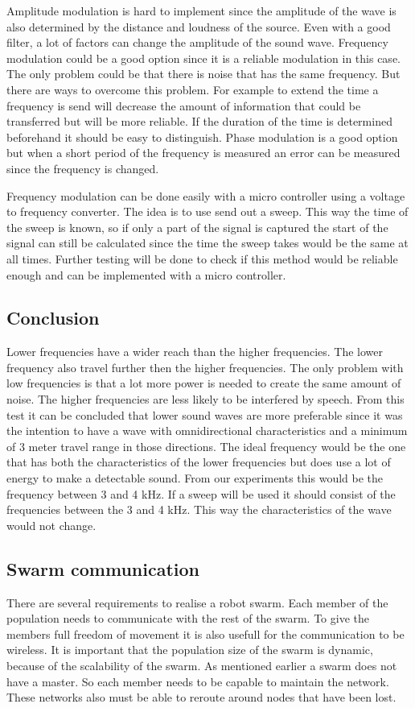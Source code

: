 \documentclass[10pt,a4paper]{article}
\begin{document}
Amplitude modulation is hard to implement since the amplitude of the wave is also determined by the distance and loudness of the source. Even with a good filter, a lot of factors can change the amplitude of the sound wave. Frequency modulation could be a good option since it is a reliable modulation in this case. The only problem could be that there is noise that has the same frequency. But there are ways to overcome this problem. For example to extend the time a frequency is send will decrease the amount of information that could be transferred but will be more reliable. If the duration of the time is determined beforehand it should be easy to distinguish. Phase modulation is a good option but when a short period of the frequency is measured an error can be measured since the frequency is changed. 

Frequency modulation can be done easily with a micro controller using a voltage to frequency converter. The idea is to use send out a sweep. This way the time of the sweep is known, so if only a part of the signal is captured the start of the signal can still be calculated since the time the sweep takes would be the same at all times. Further testing will be done to check if this method would be reliable enough and can be implemented with a micro controller.


\subsection{Conclusion}

Lower frequencies have a wider reach than the higher frequencies. The lower frequency also travel further then the higher frequencies. The only problem with low frequencies is that a lot more power is needed to create the same amount of noise. The higher frequencies are less likely to be interfered by speech. From this test it can be concluded that lower sound waves are more preferable since it was the intention to have a wave with omnidirectional characteristics and a minimum of 3 meter travel range in those directions. The ideal frequency would be the one that has both the characteristics of the lower frequencies but does use a lot of energy to make a detectable sound. From our experiments this would be the frequency between 3 and 4 kHz. If a sweep will be used it should consist of the frequencies between the 3 and 4 kHz. This way the characteristics of the wave would not change. 


\newpage
\subsection{Swarm communication}
There are several requirements to realise a robot swarm. Each member of the population needs to communicate with the rest of the swarm. To give the members full freedom of movement it is also usefull for the communication to be wireless. It is important that the population size of the swarm is dynamic, because of the scalability of the swarm. As mentioned earlier a swarm does not have a master. So each member needs to be capable to maintain the network. These networks also must be able to reroute around nodes that have been lost. \cite{Swarmwiki}\cite{swarmintelligence}
\end{document}
